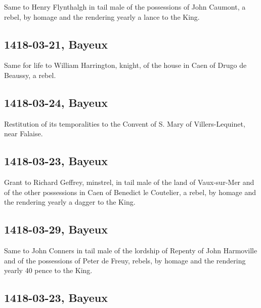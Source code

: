 \documentclass[a4paper,12pt,twoside]{book}
\begin{document}
                
                  Same to Henry Flynthalgh in tail male of the possessions of John Caumont, a rebel, by homage and the rendering yearly a lance to the King.
               
                
                \subsection{1418-03-21, Bayeux}
                
                
                  Same for life to William Harrington, knight, of the house in Caen of Drugo de Beaussy, a rebel.
               
                
                \subsection{1418-03-24, Bayeux}
                
                
                  Restitution of its temporalities to the Convent of S. Mary of Villers-Lequinet, near Falaise.
               
                
                \subsection{1418-03-23, Bayeux}
                
                
                  Grant to Richard Geffrey, minstrel, in tail male of the land of Vaux-sur-Mer and of the other possessions in Caen of Benedict le Coutelier, a rebel, by homage and the rendering yearly a dagger to the King.
               
                
                \subsection{1418-03-29, Bayeux}
                
                
                  Same to John Conners in tail male of the lordship of Repenty of John Harmoville and of the possessions of Peter de Freuy, rebels, by homage and the rendering yearly 40 pence to the King.
               
                
                \subsection{1418-03-23, Bayeux}
                
\end{document}
